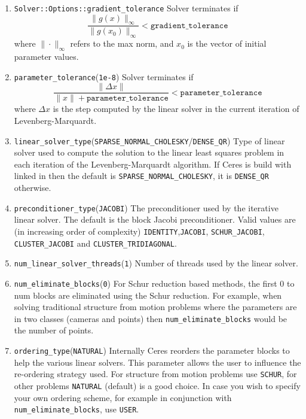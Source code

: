 \begin{enumerate}
\item \texttt{Solver::Options::gradient\_tolerance} Solver terminates if 
\begin{equation}
    \frac{\|g(x)\|_\infty}{\|g(x_0)\|_\infty} < \texttt{gradient\_tolerance}
\end{equation}
where $\|\cdot\|_\infty$ refers to the max norm, and $x_0$ is the vector of initial parameter values.

\item{\texttt{parameter\_tolerance}}(\texttt{1e-8}) Solver terminates if 
\begin{equation}
	\frac{\|\Delta x\|}{\|x\| + \texttt{parameter\_tolerance}} < \texttt{parameter\_tolerance}
\end{equation}
where $\Delta x$ is the step computed by the linear solver in the current iteration of Levenberg-Marquardt.

\item{\texttt{linear\_solver\_type}}(\texttt{SPARSE\_NORMAL\_CHOLESKY}/\texttt{DENSE\_QR}) Type of linear solver used to compute the solution to the linear least squares problem in each iteration of the Levenberg-Marquardt algorithm. If Ceres is build with \suitesparse linked in  then the default is \texttt{SPARSE\_NORMAL\_CHOLESKY}, it is \texttt{DENSE\_QR} otherwise.

\item{\texttt{preconditioner\_type}}(\texttt{JACOBI}) The preconditioner used by the iterative linear solver. The default is the block Jacobi preconditioner. Valid values are (in increasing order of complexity) \texttt{IDENTITY},\texttt{JACOBI}, \texttt{SCHUR\_JACOBI}, \texttt{CLUSTER\_JACOBI} and \texttt{CLUSTER\_TRIDIAGONAL}.

\item{\texttt{num\_linear\_solver\_threads}}(\texttt{1}) Number of threads used by the linear solver. 

\item{\texttt{num\_eliminate\_blocks}}(\texttt{0}) 
For Schur reduction based methods, the first 0 to num blocks are
    eliminated using the Schur reduction. For example, when solving
     traditional structure from motion problems where the parameters are in
     two classes (cameras and points) then \texttt{num\_eliminate\_blocks} would be the
     number of points.

\item{\texttt{ordering\_type}}(\texttt{NATURAL})
 Internally Ceres reorders the parameter blocks to help the
 various linear solvers. This parameter allows the user to
     influence the re-ordering strategy used. For structure from
     motion problems use \texttt{SCHUR}, for other problems \texttt{NATURAL} (default)
     is a good choice. In case you wish to specify your own ordering
     scheme, for example in conjunction with \texttt{num\_eliminate\_blocks},
     use \texttt{USER}.


\end{enumerate}
